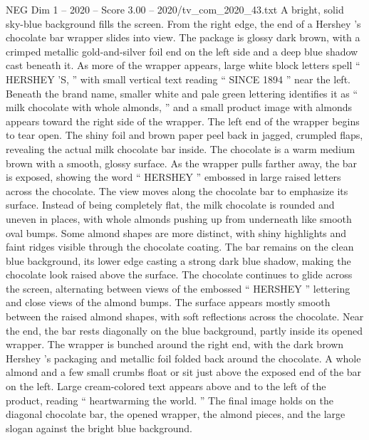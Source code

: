 \begin{textsample}{NEG Dim 1 – 2020 – Score 3.00 – 2020/tv\_com\_2020\_43.txt}  \label{ex:f1_neg_090}
A bright, solid sky-blue background fills the screen.
From the right edge, the end of a Hershey ’s chocolate bar wrapper slides into view.
The package is glossy dark brown, with a crimped metallic gold-and-silver foil end on the left side and a deep blue shadow cast beneath it.
As more of the wrapper appears, large white block letters spell “ HERSHEY ’S, ” with small vertical text reading “ SINCE 1894 ” near the left.
Beneath the brand name, smaller white and pale green lettering identifies it as “ milk chocolate with whole almonds, ” and a small product image with almonds appears toward the right side of the wrapper.
The left end of the wrapper begins to tear open.
The shiny foil and brown paper peel back in jagged, crumpled flaps, revealing the actual milk chocolate bar inside.
The chocolate is a warm medium brown with a smooth, glossy surface.
As the wrapper pulls farther away, the bar is exposed, showing the word “ HERSHEY ” embossed in large raised letters across the chocolate.
The view moves along the chocolate bar to emphasize its surface.
Instead of being completely flat, the milk chocolate is rounded and uneven in places, with whole almonds pushing up from underneath like smooth oval bumps.
Some almond shapes are more distinct, with shiny highlights and faint ridges visible through the chocolate coating.
The bar remains on the clean blue background, its lower edge casting a strong dark blue shadow, making the chocolate look raised above the surface.
The chocolate continues to glide across the screen, alternating between views of the embossed “ HERSHEY ” lettering and close views of the almond bumps.
The surface appears mostly smooth between the raised almond shapes, with soft reflections across the chocolate.
Near the end, the bar rests diagonally on the blue background, partly inside its opened wrapper.
The wrapper is bunched around the right end, with the dark brown Hershey ’s packaging and metallic foil folded back around the chocolate.
A whole almond and a few small crumbs float or sit just above the exposed end of the bar on the left.
Large cream-colored text appears above and to the left of the product, reading “ heartwarming the world. ” The final image holds on the diagonal chocolate bar, the opened wrapper, the almond pieces, and the large slogan against the bright blue background.

\end{textsample}
